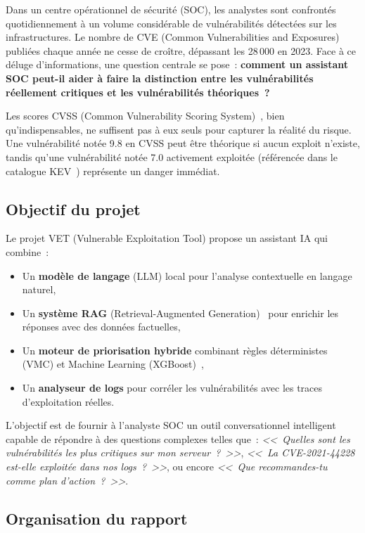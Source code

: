 \documentclass[runningheads]{llncs}
\begin{document}
Dans un centre opérationnel de sécurité (SOC), les analystes sont confrontés quotidiennement à un volume considérable de vulnérabilités détectées sur les infrastructures. Le nombre de CVE (Common Vulnerabilities and Exposures) publiées chaque année ne cesse de croître, dépassant les 28\,000 en 2023. Face à ce déluge d'informations, une question centrale se pose~: \textbf{comment un assistant SOC peut-il aider à faire la distinction entre les vulnérabilités réellement critiques et les vulnérabilités théoriques~?}

Les scores CVSS (Common Vulnerability Scoring System)~\cite{cvss31}, bien qu'indispensables, ne suffisent pas à eux seuls pour capturer la réalité du risque. Une vulnérabilité notée 9.8 en CVSS peut être théorique si aucun exploit n'existe, tandis qu'une vulnérabilité notée 7.0 activement exploitée (référencée dans le catalogue KEV~\cite{cisa_kev2024}) représente un danger immédiat.

\subsection{Objectif du projet}

Le projet VET (Vulnerable Exploitation Tool) propose un assistant IA qui combine~:
\begin{itemize}[nosep]
    \item Un \textbf{modèle de langage} (LLM) local pour l'analyse contextuelle en langage naturel,
    \item Un \textbf{système RAG} (Retrieval-Augmented Generation)~\cite{lewis2020rag} pour enrichir les réponses avec des données factuelles,
    \item Un \textbf{moteur de priorisation hybride} combinant règles déterministes (VMC) et Machine Learning (XGBoost)~\cite{chen2016xgboost},
    \item Un \textbf{analyseur de logs} pour corréler les vulnérabilités avec les traces d'exploitation réelles.
\end{itemize}

L'objectif est de fournir à l'analyste SOC un outil conversationnel intelligent capable de répondre à des questions complexes telles que~: \textit{<<~Quelles sont les vulnérabilités les plus critiques sur mon serveur~?~>>}, \textit{<<~La CVE-2021-44228 est-elle exploitée dans nos logs~?~>>}, ou encore \textit{<<~Que recommandes-tu comme plan d'action~?~>>}.

\subsection{Organisation du rapport}
\end{document}
